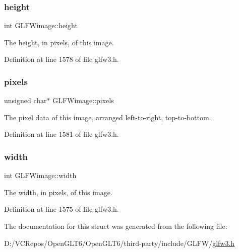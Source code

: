 \subsubsection{\texorpdfstring{height}{height}}
{\footnotesize\ttfamily int G\+L\+F\+Wimage\+::height}

The height, in pixels, of this image. 

Definition at line 1578 of file glfw3.\+h.

\mbox{\label{struct_g_l_f_wimage_a0c532a5c2bb715555279b7817daba0fb}} 
\subsubsection{\texorpdfstring{pixels}{pixels}}
{\footnotesize\ttfamily unsigned char$\ast$ G\+L\+F\+Wimage\+::pixels}

The pixel data of this image, arranged left-\/to-\/right, top-\/to-\/bottom. 

Definition at line 1581 of file glfw3.\+h.

\mbox{\label{struct_g_l_f_wimage_af6a71cc999fe6d3aea31dd7e9687d835}} 
\subsubsection{\texorpdfstring{width}{width}}
{\footnotesize\ttfamily int G\+L\+F\+Wimage\+::width}

The width, in pixels, of this image. 

Definition at line 1575 of file glfw3.\+h.



The documentation for this struct was generated from the following file\+:\begin{DoxyCompactItemize}
\item 
D\+:/\+V\+C\+Repos/\+Open\+G\+L\+T6/\+Open\+G\+L\+T6/third-\/party/include/\+G\+L\+F\+W/\mbox{\hyperlink{glfw3_8h}{glfw3.\+h}}\end{DoxyCompactItemize}
